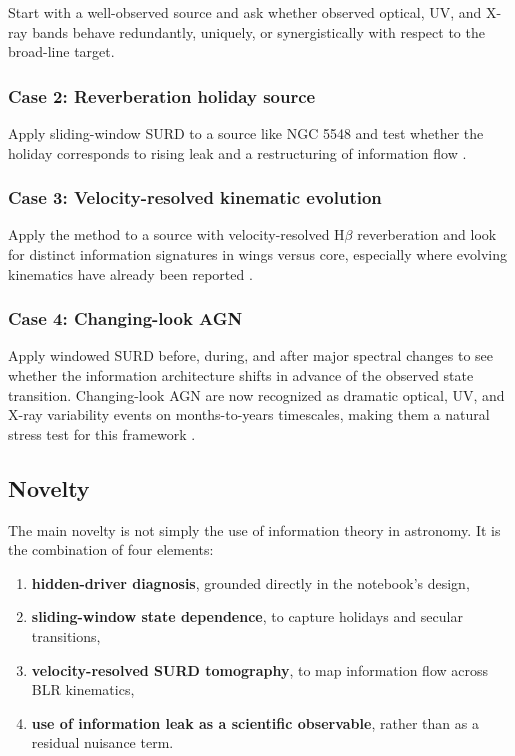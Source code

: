 \documentclass{article}
\begin{document}
Start with a well-observed source and ask whether observed optical, UV, and X-ray bands behave redundantly, uniquely, or synergistically with respect to the broad-line target.

\subsubsection{Case 2: Reverberation holiday source}

Apply sliding-window SURD to a source like NGC 5548 and test whether the holiday corresponds to rising leak and a restructuring of information flow \cite{Dehghanian2019}.

\subsubsection{Case 3: Velocity-resolved kinematic evolution}

Apply the method to a source with velocity-resolved H$\beta$ reverberation and look for distinct information signatures in wings versus core, especially where evolving kinematics have already been reported \cite{LuEtAl2022,FengEtAl2024,FengEtAl2021}.

\subsubsection{Case 4: Changing-look AGN}

Apply windowed SURD before, during, and after major spectral changes to see whether the information architecture shifts in advance of the observed state transition. Changing-look AGN are now recognized as dramatic optical, UV, and X-ray variability events on months-to-years timescales, making them a natural stress test for this framework \cite{HutchinsonEtAl2023review}.

\subsection{Novelty}

The main novelty is not simply the use of information theory in astronomy. It is the combination of four elements:
\begin{enumerate}
    \item \textbf{hidden-driver diagnosis}, grounded directly in the notebook's design,
    \item \textbf{sliding-window state dependence}, to capture holidays and secular transitions,
    \item \textbf{velocity-resolved SURD tomography}, to map information flow across BLR kinematics,
    \item \textbf{use of information leak as a scientific observable}, rather than as a residual nuisance term.
\end{enumerate}
\end{document}
